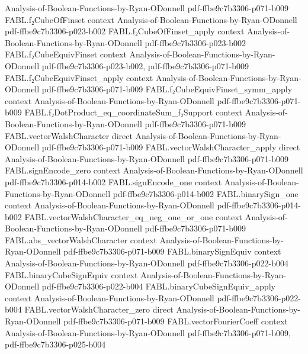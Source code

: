 \begin{theorem}
  {Analysis-of-Boolean-Functions-by-Ryan-ODonnell}
  {pdf-ffbe9c7b3306-p071-b009}
\proofstep
  {FABL.f₂CubeOfFinset}
  {context}
  {Analysis-of-Boolean-Functions-by-Ryan-ODonnell}
  {pdf-ffbe9c7b3306-p023-b002}
\proofstep
  {FABL.f₂CubeOfFinset_apply}
  {context}
  {Analysis-of-Boolean-Functions-by-Ryan-ODonnell}
  {pdf-ffbe9c7b3306-p023-b002}
\proofstep
  {FABL.f₂CubeEquivFinset}
  {context}
  {Analysis-of-Boolean-Functions-by-Ryan-ODonnell}
  {pdf-ffbe9c7b3306-p023-b002,
    pdf-ffbe9c7b3306-p071-b009}
\proofstep
  {FABL.f₂CubeEquivFinset_apply}
  {context}
  {Analysis-of-Boolean-Functions-by-Ryan-ODonnell}
  {pdf-ffbe9c7b3306-p071-b009}
\proofstep
  {FABL.f₂CubeEquivFinset_symm_apply}
  {context}
  {Analysis-of-Boolean-Functions-by-Ryan-ODonnell}
  {pdf-ffbe9c7b3306-p071-b009}
\proofstep
  {FABL.f₂DotProduct_eq_coordinateSum_f₂Support}
  {context}
  {Analysis-of-Boolean-Functions-by-Ryan-ODonnell}
  {pdf-ffbe9c7b3306-p071-b009}
\proofstep
  {FABL.vectorWalshCharacter}
  {direct}
  {Analysis-of-Boolean-Functions-by-Ryan-ODonnell}
  {pdf-ffbe9c7b3306-p071-b009}
\proofstep
  {FABL.vectorWalshCharacter_apply}
  {direct}
  {Analysis-of-Boolean-Functions-by-Ryan-ODonnell}
  {pdf-ffbe9c7b3306-p071-b009}
\proofstep
  {FABL.signEncode_zero}
  {context}
  {Analysis-of-Boolean-Functions-by-Ryan-ODonnell}
  {pdf-ffbe9c7b3306-p014-b002}
\proofstep
  {FABL.signEncode_one}
  {context}
  {Analysis-of-Boolean-Functions-by-Ryan-ODonnell}
  {pdf-ffbe9c7b3306-p014-b002}
\proofstep
  {FABL.binarySign_one}
  {context}
  {Analysis-of-Boolean-Functions-by-Ryan-ODonnell}
  {pdf-ffbe9c7b3306-p014-b002}
\proofstep
  {FABL.vectorWalshCharacter_eq_neg_one_or_one}
  {context}
  {Analysis-of-Boolean-Functions-by-Ryan-ODonnell}
  {pdf-ffbe9c7b3306-p071-b009}
\proofstep
  {FABL.abs_vectorWalshCharacter}
  {context}
  {Analysis-of-Boolean-Functions-by-Ryan-ODonnell}
  {pdf-ffbe9c7b3306-p071-b009}
\proofstep
  {FABL.binarySignEquiv}
  {context}
  {Analysis-of-Boolean-Functions-by-Ryan-ODonnell}
  {pdf-ffbe9c7b3306-p022-b004}
\proofstep
  {FABL.binaryCubeSignEquiv}
  {context}
  {Analysis-of-Boolean-Functions-by-Ryan-ODonnell}
  {pdf-ffbe9c7b3306-p022-b004}
\proofstep
  {FABL.binaryCubeSignEquiv_apply}
  {context}
  {Analysis-of-Boolean-Functions-by-Ryan-ODonnell}
  {pdf-ffbe9c7b3306-p022-b004}
\proofstep
  {FABL.vectorWalshCharacter_zero}
  {direct}
  {Analysis-of-Boolean-Functions-by-Ryan-ODonnell}
  {pdf-ffbe9c7b3306-p071-b009}
\proofstep
  {FABL.vectorFourierCoeff}
  {context}
  {Analysis-of-Boolean-Functions-by-Ryan-ODonnell}
  {pdf-ffbe9c7b3306-p071-b009,
    pdf-ffbe9c7b3306-p025-b004}

\end{theorem}
